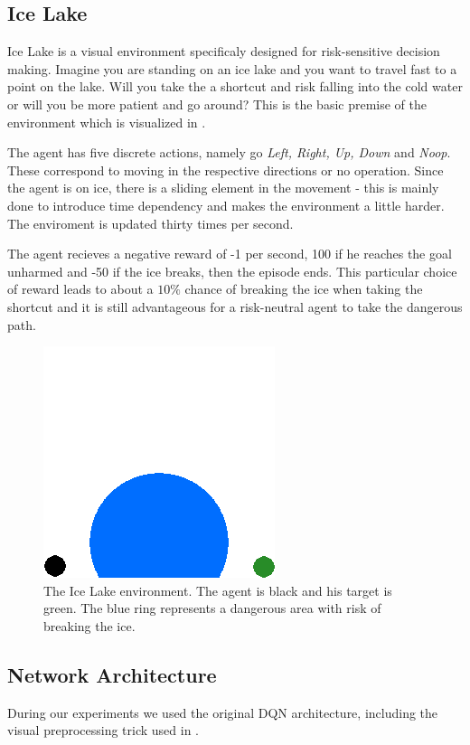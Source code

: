\subsection{Ice Lake}
Ice Lake is a visual environment specificaly designed for risk-sensitive decision making. Imagine you are standing on an ice lake and you want to travel fast to a point on the lake. Will you take the a shortcut and risk falling into the cold water or will you be more patient and go around? This is the basic premise of the environment which is visualized in .

The agent has five discrete actions, namely go \textit{Left, Right, Up, Down} and \textit{Noop}. These correspond to moving in the respective directions or no operation. Since the agent is on ice, there is a sliding element in the movement - this is mainly done to introduce time dependency and makes the environment a little harder. The enviroment is updated thirty times per second.

The agent recieves a negative reward of -1 per second, 100 if he reaches the goal unharmed and -50 if the ice breaks, then the episode ends. This particular choice of reward leads to about a $10\%$ chance of breaking the ice when taking the shortcut and it is still advantageous for a risk-neutral agent to take the dangerous path.

\begin{figure}[h]
\center
\includegraphics[width=0.3\linewidth]{gfx/icelake_start.png}
\caption{The Ice Lake environment. The agent is black and his target is green. The blue ring represents a dangerous area with risk of breaking the ice. }
\label{fig:icelake}
\end{figure}

\subsection{Network Architecture}
During our experiments we used the original DQN architecture, including the visual preprocessing trick used in \citet{mnih2015human}.

